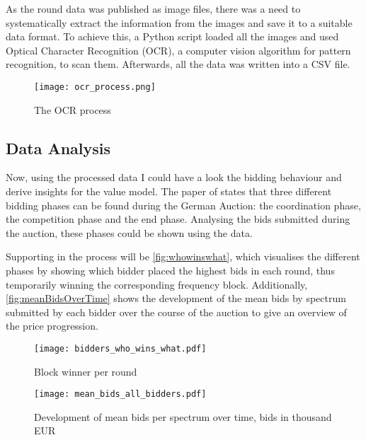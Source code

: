 As the round data was published as image files, there was a need to systematically extract the information from the images and save it to a suitable data format. To achieve this, a Python script loaded all the images and used Optical Character Recognition (OCR), a computer vision algorithm for pattern recognition, to scan them. Afterwards, all the data was written into a CSV file.

\begin{figure}[]
\centering
\texttt{[image: ocr\_process.png]} %
\caption{The OCR process} \label{fig:ocr_process}
\end{figure}

\subsection{Data Analysis}
Now, using the processed data I could have a look the bidding behaviour and derive insights for the value model. The paper of \citeauthor{Bichler2016} states that three different bidding phases can be found during the German Auction: the coordination phase, the competition phase and the end phase. Analysing the bids submitted during the auction, these phases could be shown using the data.  

Supporting in the process will be \autoref{fig:whowinswhat}, which visualises the different phases by showing which bidder placed the highest bids in each round, thus temporarily winning the corresponding frequency block. Additionally, \autoref{fig:meanBidsOverTime} shows the development of the mean bids by spectrum submitted by each bidder over the course of the auction to give an overview of the price progression.

\begin{figure}[h]
	\centering
	\texttt{[image: bidders\_who\_wins\_what.pdf]}
	\caption{Block winner per round} \label{fig:whowinswhat}
\end{figure}


\begin{figure}[h]
	\centering
	\texttt{[image: mean\_bids\_all\_bidders.pdf]}
	\caption{Development of mean bids per spectrum over time, bids in thousand EUR} \label{fig:meanBidsOverTime}
\end{figure}

